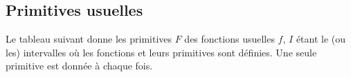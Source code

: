 \documentclass[french,11pt,twoside]{VcCours}
\newcommand{\dx}{\text{d}x}
\newcommand{\dt}{\text{d}t}
\begin{document}
%
%

\subsection{Primitives usuelles}

Le tableau suivant donne les primitives $F$ des fonctions usuelles $f$, $I$ étant le (ou les) intervalles où les fonctions et leurs primitives sont définies. Une seule primitive est donnée à chaque fois.
\end{document}

